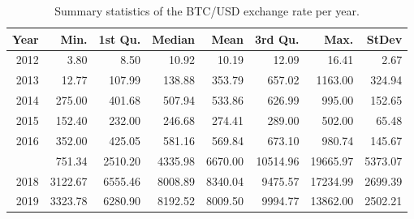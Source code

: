\begin{table}[t]

\caption{\label{tab:}Summary statistics of the BTC/USD exchange rate per year.}
\centering
\begin{tabular}{rrrrrrrr}
\toprule
Year & Min. & 1st Qu. & Median & Mean & 3rd Qu. & Max. & StDev\\
\midrule
2012 & 3.80 & 8.50 & 10.92 & 10.19 & 12.09 & 16.41 & 2.67\\
2013 & 12.77 & 107.99 & 138.88 & 353.79 & 657.02 & 1163.00 & 324.94\\
2014 & 275.00 & 401.68 & 507.94 & 533.86 & 626.99 & 995.00 & 152.65\\
2015 & 152.40 & 232.00 & 246.68 & 274.41 & 289.00 & 502.00 & 65.48\\
2016 & 352.00 & 425.05 & 581.16 & 569.84 & 673.10 & 980.74 & 145.67\\
\addlinespace
2017 & 751.34 & 2510.20 & 4335.98 & 6670.00 & 10514.96 & 19665.97 & 5373.07\\
2018 & 3122.67 & 6555.46 & 8008.89 & 8340.04 & 9475.57 & 17234.99 & 2699.39\\
2019 & 3323.78 & 6280.90 & 8192.52 & 8009.50 & 9994.77 & 13862.00 & 2502.21\\
\bottomrule
\end{tabular}
\end{table}
